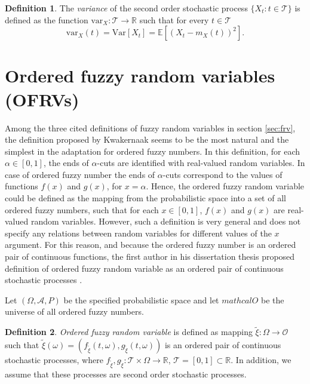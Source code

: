 \documentclass[review]{elsarticle}
\theoremstyle{definition}
\newtheorem{definition}{Definition}[section]
\theoremstyle{theorem}
\begin{document}
\begin{definition}
The {\it variance} of the second order stochastic process \linebreak $\{X_t\colon t\in\mathcal{T}\}$ is defined as the function $\mathrm{var}_X\colon\mathcal{T}\to\mathbb{R}$ such that for every $t\in\mathcal{T}$
\begin{equation}
\mathrm{var}_X(t) = \mathrm{Var}[X_t] = \mathbb{E}[(X_t-m_X(t))^2].
\end{equation}
\end{definition}

\section{Ordered fuzzy random variables (OFRVs)}
Among the three cited definitions of fuzzy random variables in section \ref{sec:frv}, the definition proposed by Kwakernaak seems to be the most natural and the simplest in the adaptation for ordered fuzzy numbers. In this definition, for each $\alpha\in [0, 1]$, the ends of $\alpha$-cuts are identified with real-valued random variables. In case of ordered fuzzy number the ends of $\alpha$-cuts correspond to the values of functions $f(x)$ and $g(x)$, for $x = \alpha$. Hence, the ordered fuzzy random variable could be defined as the mapping from the probabilistic space into a set of all ordered fuzzy numbers, such that for each $x\in [0, 1]$, $f(x)$ and $g(x)$ are real-valued random variables. However, such a definition is very general and does not specify any relations between random variables for different values of the $x$ argument. For this reason, and because the ordered fuzzy number is an ordered pair of continuous functions, the first author in his dissertation thesis proposed definition of ordered fuzzy random variable as an ordered pair of continuous stochastic processes \cite{marszalek2017}.

Let $(\Omega, \mathcal{A}, P)$ be the specified probabilistic space and let $ mathcal{O}$ be the universe of all ordered fuzzy numbers.

\begin{definition}
{\it Ordered fuzzy random variable} is defined  as mapping  $\tilde{\xi} \colon \Omega \to \mathcal {O}$ such that $ \tilde{\xi}(\omega) = \left(f_{\tilde{\xi}}(t, \omega), g_{\tilde{\xi}}(t, \omega)\right)$ is an ordered pair of continuous stochastic processes, where $f_{\tilde{\xi}}, g_{\tilde{\xi}} \colon \mathcal{T}\times \Omega \to \mathbb{R}$, $ \mathcal{T} = [0,1] \subset \mathbb{R}$. In addition, we assume that these processes are second order stochastic processes.
\end{definition}
\end{document}

